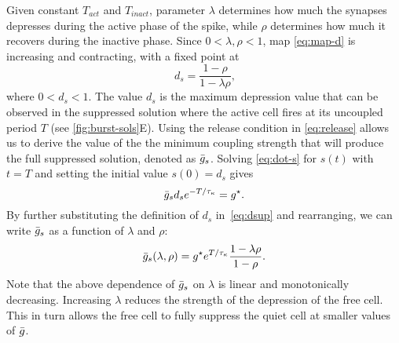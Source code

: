 \documentclass[../manuscript.tex]{subfiles}
\begin{document}
Given constant $T_{act}$ and $T_{inact}$, parameter $\lambda$ determines how much the synapses depresses during the active phase of the spike, while $\rho$ determines how much it recovers during the inactive phase.
Since $0<\lambda, \rho<1$, map \cref{eq:map-d} is increasing and contracting, with a fixed point at
\begin{equation}
  ~\label{eq:dsup}
  d_{s}=\frac{1-\rho}{1-\lambda\rho},
\end{equation}
where $0<d_{s}<1$.
The value $d_{s}$ is the maximum depression value that can be observed in the suppressed solution where the active cell fires at its uncoupled period $T$ (see \cref{fig:burst-sols}E).
Using the release condition in \cref{eq:release} allows us to derive the value of the the minimum coupling strength that will produce the full suppressed solution, denoted as $\bar g_{s}$.
Solving \cref{eq:dot-s} for $s(t)$ with $t=T$ and setting the initial value $s(0)=d_{s}$ gives
\begin{equation}
  \bar g_{s} d_{s}e^{-T/\tau_\kappa}=g^{\star}.
\end{equation}
By further substituting the definition of $d_{s}$ in~\eqref{eq:dsup} and rearranging, we can write $\bar g_{s}$ as a function of $\lambda$ and $\rho$:
\begin{equation}
  \label{eq:gs}
  \bar g_{s}(\lambda, \rho) = g^{\star}e^{T/\tau_\kappa}\frac{1-\lambda \rho}{1-\rho}.
\end{equation}
Note that the above dependence of $\bar g_{s}$ on $\lambda$ is linear and monotonically decreasing.
Increasing $\lambda$ reduces the strength of the depression of the free cell.
This in turn allows the free cell to fully suppress the quiet cell at smaller values of $\bar g$.
\end{document}
